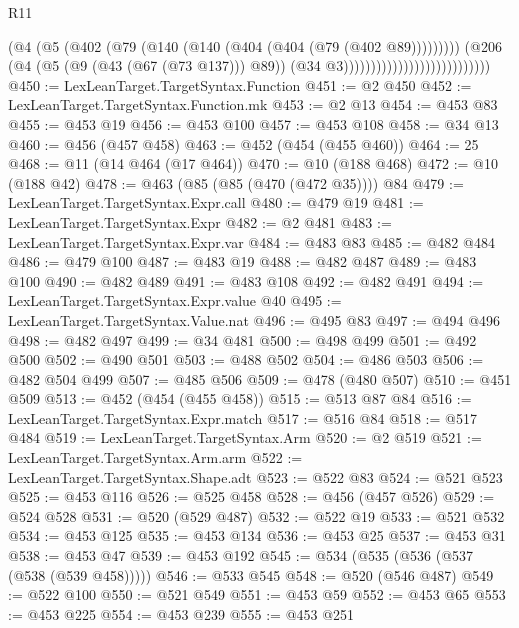 \begin{lexlean}{R11}
\begin{coremodule}
                                                  (@4
                                                    (@5
                                                      (@402
                                                        (@79
                                                          (@140
                                                            (@140
                                                              (@404 (@404 (@79 (@402 @89)))))))))
                                                    (@206
                                                      (@4
                                                        (@5 (@9 (@43 (@67 (@73 @137))) @89))
                                                        (@34 @3)))))))))))))))))))))))))))
@450 := LexLeanTarget.TargetSyntax.Function
@451 := @2 @450
@452 := LexLeanTarget.TargetSyntax.Function.mk
@453 := @2 @13
@454 := @453 @83
@455 := @453 @19
@456 := @453 @100
@457 := @453 @108
@458 := @34 @13
@460 := @456 (@457 @458)
@463 := @452 (@454 (@455 @460))
@464 := 25
@468 := @11 (@14 @464 (@17 @464))
@470 := @10 (@188 @468)
@472 := @10 (@188 @42)
@478 := @463 (@85 (@85 (@470 (@472 @35)))) @84
@479 := LexLeanTarget.TargetSyntax.Expr.call
@480 := @479 @19
@481 := LexLeanTarget.TargetSyntax.Expr
@482 := @2 @481
@483 := LexLeanTarget.TargetSyntax.Expr.var
@484 := @483 @83
@485 := @482 @484
@486 := @479 @100
@487 := @483 @19
@488 := @482 @487
@489 := @483 @100
@490 := @482 @489
@491 := @483 @108
@492 := @482 @491
@494 := LexLeanTarget.TargetSyntax.Expr.value @40
@495 := LexLeanTarget.TargetSyntax.Value.nat
@496 := @495 @83
@497 := @494 @496
@498 := @482 @497
@499 := @34 @481
@500 := @498 @499
@501 := @492 @500
@502 := @490 @501
@503 := @488 @502
@504 := @486 @503
@506 := @482 @504 @499
@507 := @485 @506
@509 := @478 (@480 @507)
@510 := @451 @509
@513 := @452 (@454 (@455 @458))
@515 := @513 @87 @84
@516 := LexLeanTarget.TargetSyntax.Expr.match
@517 := @516 @84
@518 := @517 @484
@519 := LexLeanTarget.TargetSyntax.Arm
@520 := @2 @519
@521 := LexLeanTarget.TargetSyntax.Arm.arm
@522 := LexLeanTarget.TargetSyntax.Shape.adt
@523 := @522 @83
@524 := @521 @523
@525 := @453 @116
@526 := @525 @458
@528 := @456 (@457 @526)
@529 := @524 @528
@531 := @520 (@529 @487)
@532 := @522 @19
@533 := @521 @532
@534 := @453 @125
@535 := @453 @134
@536 := @453 @25
@537 := @453 @31
@538 := @453 @47
@539 := @453 @192
@545 := @534 (@535 (@536 (@537 (@538 (@539 @458)))))
@546 := @533 @545
@548 := @520 (@546 @487)
@549 := @522 @100
@550 := @521 @549
@551 := @453 @59
@552 := @453 @65
@553 := @453 @225
@554 := @453 @239
@555 := @453 @251

\end{coremodule}
\end{lexlean}
